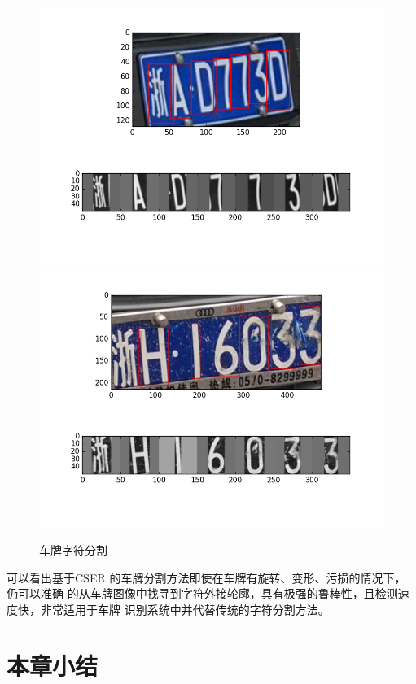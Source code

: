 \begin{figure}[th]
\centering
{}
{\includegraphics[width=1\linewidth]{./Figure/SegmentationDemo.png}}
{\includegraphics[width=1\linewidth]{./Figure/SegmentationDemo2.png}}
\caption{车牌字符分割}\label{Fig:SegmentationDemo}
\end{figure}

可以看出基于CSER 的车牌分割方法即使在车牌有旋转、变形、污损的情况下，仍可以准确
的从车牌图像中找寻到字符外接轮廓，具有极强的鲁棒性，且检测速度快，非常适用于车牌
识别系统中并代替传统的字符分割方法。

\section{本章小结}

